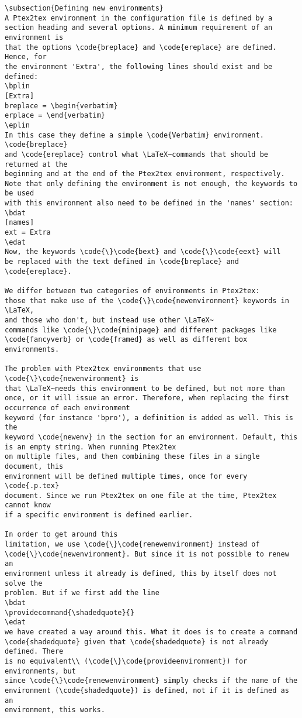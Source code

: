 \documentclass[a4paper,11pt]{article}
\begin{document}
{{{{{{{{{{{\begin{Verbatim}
\subsection{Defining new environments}
A Ptex2tex environment in the configuration file is defined by a
section heading and several options. A minimum requirement of an environment is
that the options \code{breplace} and \code{ereplace} are defined. Hence, for
the environment 'Extra', the following lines should exist and be defined:
\bplin
[Extra]
breplace = \begin{verbatim} 
erplace = \end{verbatim}
\eplin
In this case they define a simple \code{Verbatim} environment. \code{breplace}
and \code{ereplace} control what \LaTeX~commands that should be returned at the
beginning and at the end of the Ptex2tex environment, respectively.
Note that only defining the environment is not enough, the keywords to be used
with this environment also need to be defined in the 'names' section:
\bdat
[names]
ext = Extra
\edat
Now, the keywords \code{\}\code{bext} and \code{\}\code{eext} will
be replaced with the text defined in \code{breplace} and \code{ereplace}.

We differ between two categories of environments in Ptex2tex: 
those that make use of the \code{\}\code{newenvironment} keywords in \LaTeX,
and those who don't, but instead use other \LaTeX~
commands like \code{\}\code{minipage} and different packages like
\code{fancyverb} or \code{framed} as well as different box environments. 

The problem with Ptex2tex environments that use \code{\}\code{newenvironment} is
that \LaTeX~needs this environment to be defined, but not more than
once, or it will issue an error. Therefore, when replacing the first occurrence of each environment
keyword (for instance 'bpro'), a definition is added as well. This is the
keyword \code{newenv} in the section for an environment. Default, this
is an empty string. When running Ptex2tex
on multiple files, and then combining these files in a single document, this
environment will be defined multiple times, once for every \code{.p.tex}
document. Since we run Ptex2tex on one file at the time, Ptex2tex cannot know
if a specific environment is defined earlier. 

In order to get around this
limitation, we use \code{\}\code{renewenvironment} instead of
\code{\}\code{newenvironment}. But since it is not possible to renew an
environment unless it already is defined, this by itself does not solve the
problem. But if we first add the line
\bdat
\providecommand{\shadedquote}{}
\edat
we have created a way around this. What it does is to create a command
\code{shadedquote} given that \code{shadedquote} is not already defined. There
is no equivalent\\ (\code{\}\code{provideenvironment}) for environments, but
since \code{\}\code{renewenvironment} simply checks if the name of the
environment (\code{shadedquote}) is defined, not if it is defined as an
environment, this works. 


\end{Verbatim}}}}}}}}}}}}
\end{document}
